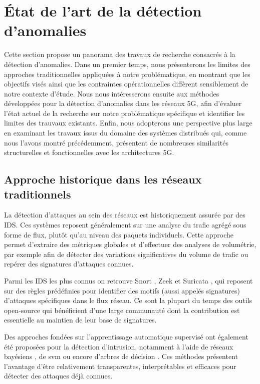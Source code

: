 \documentclass[a4paper,11pt,twoside]{StyleThese}
\begin{document}
\section{État de l’art de la détection d’anomalies}
Cette section propose un panorama des travaux de recherche consacrés à la détection d’anomalies. Dans un premier temps, nous présenterons les limites des approches traditionnelles appliquées à notre problématique, en montrant que les objectifs visés ainsi que les contraintes opérationnelles diffèrent sensiblement de notre contexte d’étude. Nous nous intéresserons ensuite aux méthodes développées pour la détection d’anomalies dans les réseaux 5G, afin d’évaluer l’état actuel de la recherche sur notre problématique spécifique et identifier les limites des trauvaux existants. Enfin, nous adopterons une perspective plus large en examinant les travaux issus du domaine des systèmes distribués qui, comme nous l’avons montré précédemment, présentent de nombreuses similarités structurelles et fonctionnelles avec les architectures 5G.

\subsection{Approche historique dans les réseaux traditionnels}
La détection d’attaques au sein des réseaux est historiquement assurée par des IDS. Ces systèmes reposent généralement sur une analyse du trafic agrégé sous forme de flux, plutôt qu’au niveau des paquets individuels. Cette approche permet d’extraire des métriques globales et d’effectuer des analyses de volumétrie, par exemple afin de détecter des variations significatives du volume de trafic ou repérer des signatures d'attaques connues.

Parmi les IDS les plus connus on retrouve Snort \cite{snort}, Zeek \cite{zeek} et Suricata \cite{suricata}, qui reposent sur des règles prédéfinies pour identifier des motifs (aussi appelés signatures) d’attaques spécifiques dans le flux réseau. Ce sont la plupart du temps des outils open-source qui bénéficient d'une large communauté dont la contribution est essentielle au maintien de leur base de signatures.

Des approches fondées sur l’apprentissage automatique supervisé ont également été proposées pour la détection d’intrusion, notamment à l’aide de réseaux bayésiens \cite{bayesian}, de \gls{svm} \cite{svm} ou encore d’arbres de décision \cite{decision_tree}. Ces méthodes présentent l’avantage d’être relativement transparentes, interprétables et efficaces pour détecter des attaques déjà connues.
\end{document}
